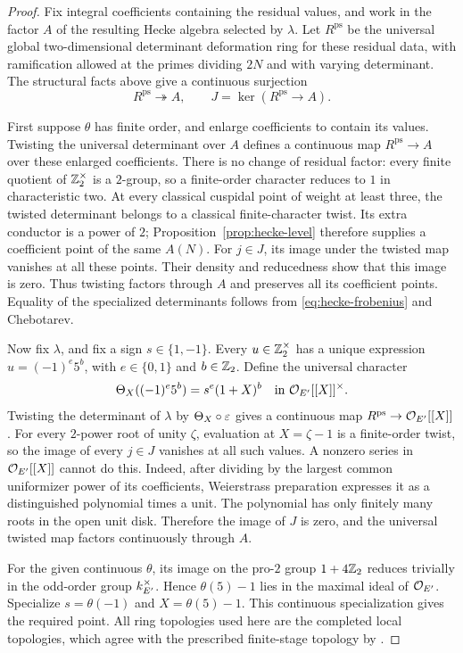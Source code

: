 \begin{proof}
Fix integral coefficients containing the residual values, and
work in the factor $A$ of the resulting Hecke algebra selected
by $\lambda$.  Let $R^{\mathrm{ps}}$ be the universal global
two-dimensional determinant deformation ring for these residual
data, with ramification allowed at the primes dividing $2N$ and
with varying determinant.  The structural facts above give a
continuous surjection
\[
 R^{\mathrm{ps}}\twoheadrightarrow A,
 \qquad J=\ker(R^{\mathrm{ps}}\longrightarrow A).
\]

First suppose $\theta$ has finite order, and enlarge coefficients
to contain its values.  Twisting the universal determinant over
$A$ defines a continuous map $R^{\mathrm{ps}}\to A$ over these
enlarged coefficients.  There is no change of residual factor:
every finite quotient of $\mathbb Z_2^\times$ is a $2$-group, so a
finite-order character reduces to $1$ in characteristic two.
At every classical cuspidal point of weight at least three,
the twisted determinant belongs to a classical finite-character
twist.  Its extra conductor is a power of $2$; Proposition~\ref{prop:hecke-level}
therefore supplies a coefficient point of the same $A(N)$.
For $j\in J$, its image under the twisted map vanishes at all
these points.  Their density and reducedness show that this image
is zero.  Thus twisting factors through $A$ and preserves all its
coefficient points.  Equality of the specialized determinants
follows from \eqref{eq:hecke-frobenius} and Chebotarev.

Now fix $\lambda$, and fix a sign $s\in\{1,-1\}$.  Every
$u\in\mathbb Z_2^\times$ has a unique expression $u=(-1)^e5^b$,
with $e\in\{0,1\}$ and $b\in\mathbb Z_2$.  Define the universal character
\[
 \Theta_X((-1)^e5^b)=s^e(1+X)^b
 \quad\text{in }\mathcal O_{E'}[[X]]^\times.
\]
Twisting the determinant of $\lambda$ by $\Theta_X\circ\varepsilon$
gives a continuous map
$R^{\mathrm{ps}}\to\mathcal O_{E'}[[X]]$.
For every $2$-power root of unity $\zeta$, evaluation at
$X=\zeta-1$ is a finite-order twist, so the image of every
$j\in J$ vanishes at all such values.  A nonzero series in
$\mathcal O_{E'}[[X]]$ cannot do this.  Indeed, after dividing by the
largest common uniformizer power of its coefficients,
Weierstrass preparation expresses it as a distinguished polynomial
times a unit.  The polynomial has only finitely many roots in
the open unit disk.  Therefore the image of $J$ is zero, and the
universal twisted map factors continuously through $A$.

For the given continuous $\theta$, its image on the pro-$2$
group $1+4\mathbb Z_2$ reduces trivially in the odd-order group
$k_{E'}^\times$.  Hence $\theta(5)-1$ lies in the maximal
ideal of $\mathcal O_{E'}$.  Specialize $s=\theta(-1)$ and
$X=\theta(5)-1$.  This continuous specialization gives the
required point.  All ring topologies used here are the completed
local topologies, which agree with the prescribed finite-stage
topology by \cite[Proposition~2.3]{Dim}.
\end{proof}

